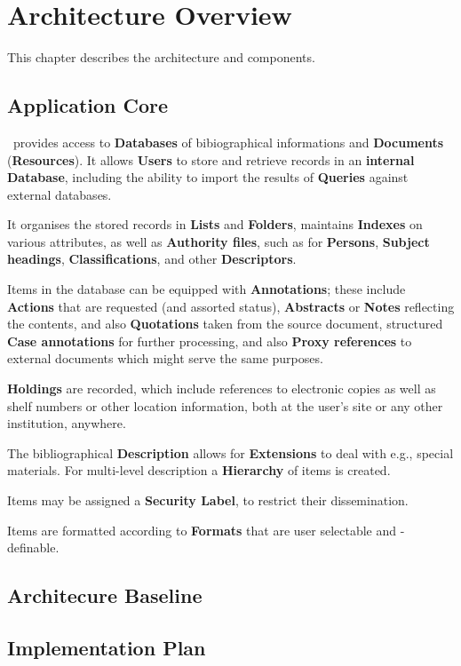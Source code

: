 
\chapter{Architecture Overview}
\label{cha:archiview}

This chapter describes the architecture and components.


\section{Application Core}
\label{sec:archicore}

\Pyb\ provides access to \textbf{Databases} of bibiographical
informations and \textbf{Documents} (\textbf{Resources}). It allows
\textbf{Users} to store and retrieve records in an \textbf{internal
  Database}, including the ability to import the results of
\textbf{Queries} against external databases.  

It organises the stored records in \textbf{Lists} and
\textbf{Folders}, maintains \textbf{Indexes} on various attributes,
as well as \textbf{Authority files}, such as for \textbf{Persons},
\textbf{Subject headings}, \textbf{Classifications}, and other
\textbf{Descriptors}. 

Items in the database can be equipped with \textbf{Annotations}; these
include \textbf{Actions} that are requested (and assorted status),
\textbf{Abstracts} or \textbf{Notes} reflecting the contents, and also
\textbf{Quotations} taken from the source document, structured
\textbf{Case annotations} for further processing, and also
\textbf{Proxy references} to external documents which might serve the
same purposes. 

\textbf{Holdings} are recorded, which include references to electronic
copies as well as shelf numbers or other location information, both at
the user's site or any other institution, anywhere.

The bibliographical \textbf{Description} allows for
\textbf{Extensions} to deal with e.g., special materials.  For
multi-level description a \textbf{Hierarchy} of items is created. 

Items may be assigned a \textbf{Security Label}, to restrict their
dissemination. 

Items are formatted according to \textbf{Formats} that are user
selectable and -definable. 


\section{Architecure Baseline}
\label{sec:archibase}


\section{Implementation Plan}
\label{sec:archiplan}




